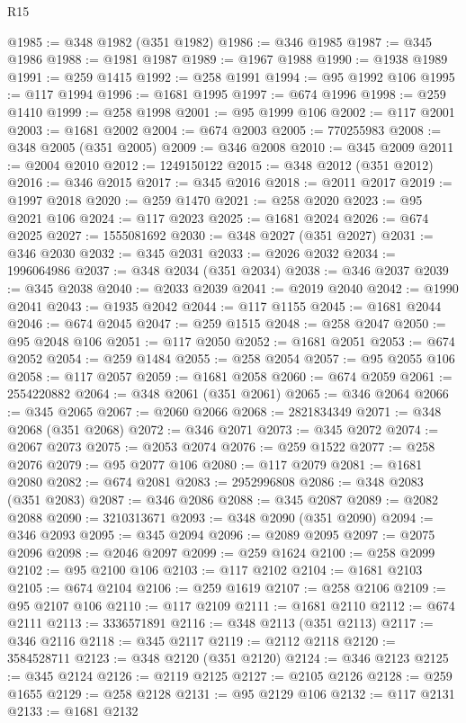 \begin{lexlean}{R15}
\begin{coremodule}
@1985 := @348 @1982 (@351 @1982)
@1986 := @346 @1985
@1987 := @345 @1986
@1988 := @1981 @1987
@1989 := @1967 @1988
@1990 := @1938 @1989
@1991 := @259 @1415
@1992 := @258 @1991
@1994 := @95 @1992 @106
@1995 := @117 @1994
@1996 := @1681 @1995
@1997 := @674 @1996
@1998 := @259 @1410
@1999 := @258 @1998
@2001 := @95 @1999 @106
@2002 := @117 @2001
@2003 := @1681 @2002
@2004 := @674 @2003
@2005 := 770255983
@2008 := @348 @2005 (@351 @2005)
@2009 := @346 @2008
@2010 := @345 @2009
@2011 := @2004 @2010
@2012 := 1249150122
@2015 := @348 @2012 (@351 @2012)
@2016 := @346 @2015
@2017 := @345 @2016
@2018 := @2011 @2017
@2019 := @1997 @2018
@2020 := @259 @1470
@2021 := @258 @2020
@2023 := @95 @2021 @106
@2024 := @117 @2023
@2025 := @1681 @2024
@2026 := @674 @2025
@2027 := 1555081692
@2030 := @348 @2027 (@351 @2027)
@2031 := @346 @2030
@2032 := @345 @2031
@2033 := @2026 @2032
@2034 := 1996064986
@2037 := @348 @2034 (@351 @2034)
@2038 := @346 @2037
@2039 := @345 @2038
@2040 := @2033 @2039
@2041 := @2019 @2040
@2042 := @1990 @2041
@2043 := @1935 @2042
@2044 := @117 @1155
@2045 := @1681 @2044
@2046 := @674 @2045
@2047 := @259 @1515
@2048 := @258 @2047
@2050 := @95 @2048 @106
@2051 := @117 @2050
@2052 := @1681 @2051
@2053 := @674 @2052
@2054 := @259 @1484
@2055 := @258 @2054
@2057 := @95 @2055 @106
@2058 := @117 @2057
@2059 := @1681 @2058
@2060 := @674 @2059
@2061 := 2554220882
@2064 := @348 @2061 (@351 @2061)
@2065 := @346 @2064
@2066 := @345 @2065
@2067 := @2060 @2066
@2068 := 2821834349
@2071 := @348 @2068 (@351 @2068)
@2072 := @346 @2071
@2073 := @345 @2072
@2074 := @2067 @2073
@2075 := @2053 @2074
@2076 := @259 @1522
@2077 := @258 @2076
@2079 := @95 @2077 @106
@2080 := @117 @2079
@2081 := @1681 @2080
@2082 := @674 @2081
@2083 := 2952996808
@2086 := @348 @2083 (@351 @2083)
@2087 := @346 @2086
@2088 := @345 @2087
@2089 := @2082 @2088
@2090 := 3210313671
@2093 := @348 @2090 (@351 @2090)
@2094 := @346 @2093
@2095 := @345 @2094
@2096 := @2089 @2095
@2097 := @2075 @2096
@2098 := @2046 @2097
@2099 := @259 @1624
@2100 := @258 @2099
@2102 := @95 @2100 @106
@2103 := @117 @2102
@2104 := @1681 @2103
@2105 := @674 @2104
@2106 := @259 @1619
@2107 := @258 @2106
@2109 := @95 @2107 @106
@2110 := @117 @2109
@2111 := @1681 @2110
@2112 := @674 @2111
@2113 := 3336571891
@2116 := @348 @2113 (@351 @2113)
@2117 := @346 @2116
@2118 := @345 @2117
@2119 := @2112 @2118
@2120 := 3584528711
@2123 := @348 @2120 (@351 @2120)
@2124 := @346 @2123
@2125 := @345 @2124
@2126 := @2119 @2125
@2127 := @2105 @2126
@2128 := @259 @1655
@2129 := @258 @2128
@2131 := @95 @2129 @106
@2132 := @117 @2131
@2133 := @1681 @2132

\end{coremodule}
\end{lexlean}
